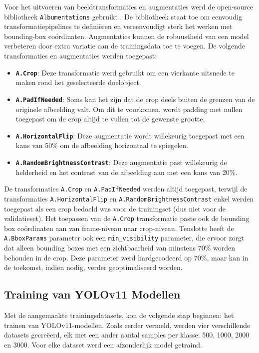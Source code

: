 Voor het uitvoeren van beeldtransformaties en augmentaties werd de open-source bibliotheek \texttt{Albumentations} gebruikt \autocite{Buslaev2018}.
De bibliotheek staat toe om eenvoudig transformatiepipelines te definiëren en vereenvoudigt sterk het werken met bounding-box coördinaten.
Augmentaties kunnen de robuustheid van een model verbeteren door extra variatie aan de trainingsdata toe te voegen.
De volgende transformaties en augmentaties werden toegepast:
\begin{itemize}
    \item \textbf{\texttt{A.Crop}}: Deze transformatie werd gebruikt om een vierkante uitsnede te maken rond het geselecteerde doelobject.
    \item \textbf{\texttt{A.PadIfNeeded}}: Soms kan het zijn dat de crop deels buiten de grenzen van de originele afbeelding valt.
    Om dit te voorkomen, wordt padding met nullen toegepast om de crop altijd te vullen tot de gewenste grootte.
    \item \textbf{\texttt{A.HorizontalFlip}}: Deze augmentatie wordt willekeurig toegepast met een kans van 50\% om de afbeelding horizontaal te spiegelen.
    \item \textbf{\texttt{A.RandomBrightnessContrast}}: Deze augmentatie past willekeurig de helderheid en het contrast van de afbeelding aan met een kans van 20\%.
\end{itemize}
De transformaties \texttt{A.Crop} en \texttt{A.PadIfNeeded} werden altijd toegepast,
terwijl de transformaties \texttt{A.HorizontalFlip} en \texttt{A.RandomBrightnessContrast} 
enkel werden toegepast als een crop bedoeld was voor de trainingset (dus niet voor de validatieset).
Het toepassen van de \texttt{A.Crop} transformatie paste ook de bounding box coördinaten aan van frame-niveau naar crop-niveau.
Tenslotte heeft de \texttt{A.BboxParams} parameter ook een \texttt{min\_visibility} parameter, die ervoor zorgt dat alleen bounding boxes
met een zichtbaarheid van minstens 70\% worden behouden in de crop.
Deze parameter werd hardgecodeerd op 70\%, maar kan in de toekomst, indien nodig, verder geoptimaliseerd worden.

\subsection{Training van YOLOv11 Modellen}

Met de aangemaakte trainingsdatasets, kon de volgende stap beginnen: het trainen van YOLOv11-modellen.
Zoals eerder vermeld, werden vier verschillende datasets gecreëerd, elk met een ander aantal samples per klasse: 500, 1000, 2000 en 3000.
Voor elke dataset werd een afzonderlijk model getraind.

